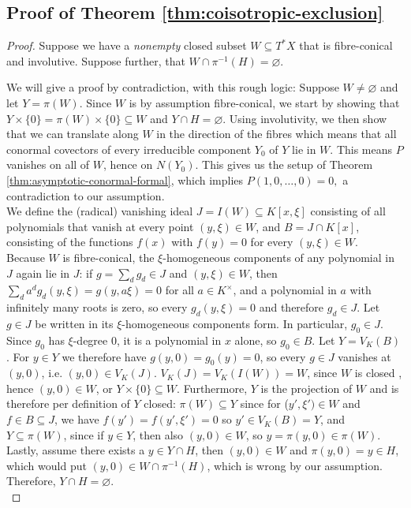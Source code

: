 \documentclass[pdflatex,sn-mathphys-num]{sn-jnl}
\numberwithin{equation}{section}
\theoremstyle{thmstyleone}
\theoremstyle{thmstyletwo}
\begin{document}
\subsection{Proof of Theorem \ref{thm:coisotropic-exclusion}}\label{sub:excl}
\begin{proof}
Suppose we have a \textit{nonempty} closed subset $W\subseteq T^*X$ that is fibre-conical and involutive. Suppose further, that $W\cap\pi^{-1}(H)=\varnothing$. 

We will give a proof by contradiction, with this rough logic: Suppose $W\neq\varnothing$ and let $Y = \pi(W)$. Since $W$ is by assumption fibre-conical, we start by showing that $Y\times \{0\} = \pi(W)\times \{0\} \subseteq W$ and $Y \cap H = \varnothing$.  Using involutivity, we then show that we can translate along $W$ in the direction of the fibres which means that all conormal covectors of every irreducible component $Y_0$ of $Y$ lie in $W$. This means $P$ vanishes on all of $W$, hence on $N(Y_0)$. This gives us the setup of Theorem \ref{thm:asymptotic-conormal-formal}, which implies $P(1,0,\dots,0) = 0,$ a contradiction to our assumption. \\


We define the (radical) vanishing ideal $J=I(W)\subseteq K[x,\xi]$ consisting of all polynomials that vanish at every point $(y,\xi)\in W$, and $B=J\cap K[x]$, consisting of the functions $f(x)$ with $f(y)=0$ for every $(y,\xi) \in W$. \\
Because $W$ is fibre-conical, the $\xi$-homogeneous components of any
polynomial in $J$ again lie in $J$: if $g=\sum_dg_d\in J$ and
$(y,\xi)\in W$, then $\sum_da^dg_d(y,\xi)=g(y,a\xi)=0$ for all $a\in K^\times$,
and a polynomial in $a$ with infinitely many roots is zero, so every
$g_d(y,\xi)=0$ and therefore $g_d \in J$. 
Let $g \in J$ be written in its $\xi$-homogeneous components form. In particular, $g_0 \in J$. Since $g_0$ has $\xi$-degree $0$, it is a polynomial in $x$ alone, so $g_0 \in B$. Let $Y = V_K(B)$. For $y \in Y$ we therefore have $g(y, 0) = g_0(y) = 0$, so every $g \in J$ vanishes at $(y,0)$, i.e. $(y,0)\in V_K(J)$. $V_K(J) = V_K(I(W)) = W$, since $W$ is closed \cite[Prop. I.1.2]{hartshorne},  hence $(y, 0) \in W$, or $Y \times \{0\} \subseteq W$. 
Furthermore, $Y$ is the projection of $W$ and is therefore per definition of $Y$ closed: $\pi(W)\subseteq Y$ since for ($y',\xi')\in W$ and $f \in B\subseteq J$, we have $f(y') = f(y',\xi') = 0$ so $y' \in V_K(B) = Y$, and $Y\subseteq \pi(W)$, since if $y \in Y$, then also $(y,0)\in W$, so $y = \pi(y,0) \in \pi(W)$.\\
Lastly, assume there exists a $y \in Y\cap H$, then $(y,0)\in W$ and $\pi(y,0) = y \in H$, which would put $(y,0)\in W\cap \pi^{-1}(H)$, which is wrong by our assumption. Therefore, $Y \cap H = \varnothing$.\\


\end{proof}
\end{document}
